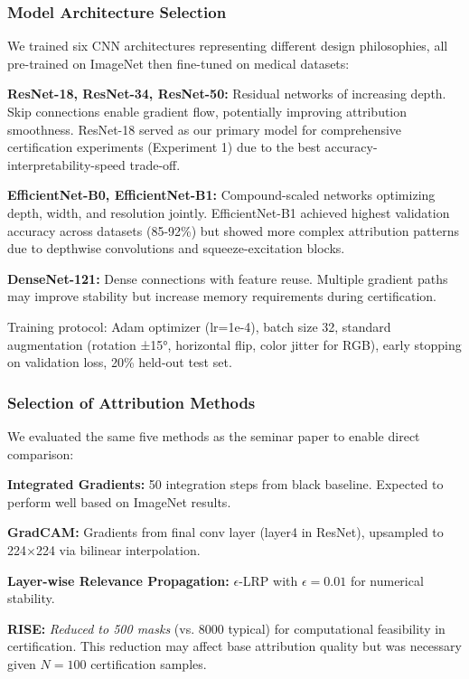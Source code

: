 \documentclass[11pt]{article}
\begin{document}
\subsubsection{Model Architecture Selection}

We trained six CNN architectures representing different design philosophies, all pre-trained on ImageNet then fine-tuned on medical datasets:

\textbf{ResNet-18, ResNet-34, ResNet-50:} Residual networks of increasing depth. Skip connections enable gradient flow, potentially improving attribution smoothness. ResNet-18 served as our primary model for comprehensive certification experiments (Experiment 1) due to the best accuracy-interpretability-speed trade-off.

\textbf{EfficientNet-B0, EfficientNet-B1:} Compound-scaled networks optimizing depth, width, and resolution jointly. EfficientNet-B1 achieved highest validation accuracy across datasets (85-92\%) but showed more complex attribution patterns due to depthwise convolutions and squeeze-excitation blocks.

\textbf{DenseNet-121:} Dense connections with feature reuse. Multiple gradient paths may improve stability but increase memory requirements during certification.

Training protocol: Adam optimizer (lr=1e-4), batch size 32, standard augmentation (rotation ±15°, horizontal flip, color jitter for RGB), early stopping on validation loss, 20\% held-out test set.

\subsubsection{Selection of Attribution Methods}

We evaluated the same five methods as the seminar paper to enable direct comparison:

\textbf{Integrated Gradients:} 50 integration steps from black baseline. Expected to perform well based on ImageNet results.

\textbf{GradCAM:} Gradients from final conv layer (layer4 in ResNet), upsampled to 224×224 via bilinear interpolation.

\textbf{Layer-wise Relevance Propagation:} $\epsilon$-LRP with $\epsilon=0.01$ for numerical stability.

\textbf{RISE:} \textit{Reduced to 500 masks} (vs. 8000 typical) for computational feasibility in certification. This reduction may affect base attribution quality but was necessary given $N=100$ certification samples.
\end{document}

